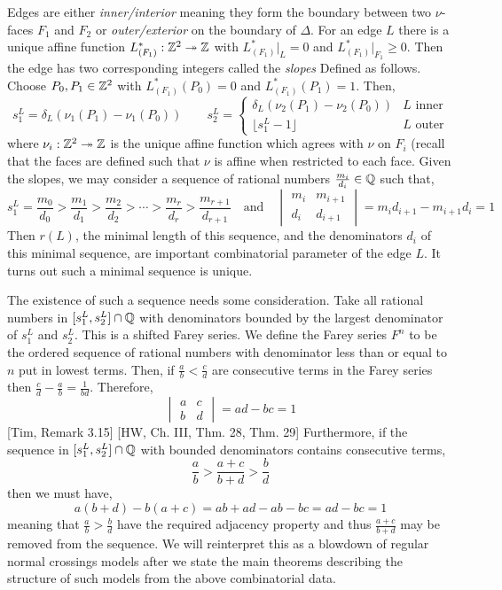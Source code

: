 \documentclass[12pt]{article}
\begin{document}
\begin{defn}[Slopes]
Edges are either \textit{inner/interior} meaning they form the boundary between two $\nu$-faces $F_1$ and $F_2$ or \textit{outer/exterior} on the boundary of $\Delta$. For an edge $L$ there is a unique affine function $L^*_{(F_1)} : \mathbb{Z}^2 \twoheadrightarrow \mathbb{Z}$ with $L^*_{(F_1)} |_L = 0$ and $L^*_{(F_1)}|_{F_1} \ge 0$. Then the edge has two corresponding integers called the \textit{slopes} Defined as follows. Choose $P_0, P_1 \in \mathbb{Z}^2$ with $L^*_{(F_1)}(P_0) = 0$ and $L_{(F_1)}^*(P_1) =1$. Then,
\[ s_1^L = \delta_L (\nu_1(P_1) - \nu_1(P_0)) \quad \quad s_2^L = 
\begin{cases}
\delta_L (\nu_2(P_1) - \nu_2(P_0)) & L \text{ inner}
\\
\lfloor s_1^L - 1 \rfloor & L \text{ outer}
\end{cases} \]
where $\nu_i : \mathbb{Z}^2 \twoheadrightarrow \mathbb{Z}$ is the unique affine function which agrees with $\nu$ on $F_i$ (recall that the faces are defined such that $\nu$ is affine when restricted to each face. Given the slopes, we may consider a sequence of rational numbers $\frac{m_i}{d_i} \in \mathbb{Q}$ such that,
\[ s_1^L = \frac{m_0}{d_0} > \frac{m_1}{d_1} > \frac{m_2}{d_2} > \cdots > \frac{m_r}{d_r} > \frac{m_{r+1}}{d_{r+1}} \quad \text{and} \quad 
\begin{vmatrix}
m_i & m_{i+1}
\\
d_i & d_{i+1}
\end{vmatrix} = m_i d_{i+1} - m_{i+1} d_i = 1 \]
Then $r(L)$, the minimal length of this sequence, and the denominators $d_i$ of this minimal sequence, are important combinatorial parameter of the edge $L$. It turns out such a minimal sequence is unique.
\end{defn}

\begin{rmk}
The existence of such a sequence needs some consideration. Take all rational numbers in $[s_1^L, s_2^L] \cap \mathbb{Q}$ with denominators bounded by the largest denominator of $s_1^L$ and $s_2^L$. This is a shifted Farey series. We define the Farey series $F^n$ to be the ordered sequence of rational numbers with denominator less than or equal to $n$ put in lowest terms. Then, if $\frac{a}{b} < \frac{c}{d}$ are consecutive terms in the Farey series then $\frac{c}{d} - \frac{a}{b} = \frac{1}{bd}$. Therefore,
\[ \begin{vmatrix}
a & c 
\\
b & d 
\end{vmatrix}
= ad - bc = 1 \] 
[Tim, Remark 3.15] [HW, Ch. III, Thm. 28, Thm. 29]
Furthermore, if the sequence in $[s_1^L, s_2^L] \cap \mathbb{Q}$ with bounded denominators contains consecutive terms,
\[ \frac{a}{b} > \frac{a + c}{b + d} > \frac{b}{d} \]
then we must have,
\[ a(b + d) - b(a + c) = ab + ad - ab - bc = ad - bc = 1 \]
meaning that $\frac{a}{b} > \frac{b}{d}$ have the required adjacency property and thus $\frac{a + c}{b + d}$ may be removed from the sequence. We will reinterpret this as a blowdown of regular normal crossings models after we state the main theorems describing the structure of such models from the above combinatorial data.
\end{rmk}
\end{document}
